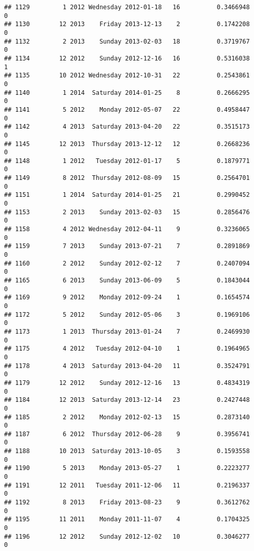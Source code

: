 \documentclass[
]{article}
\begin{document}
\begin{verbatim}
## 1129         1 2012 Wednesday 2012-01-18   16          0.3466948             0
## 1130        12 2013    Friday 2013-12-13    2          0.1742208             0
## 1132         2 2013    Sunday 2013-02-03   18          0.3719767             0
## 1134        12 2012    Sunday 2012-12-16   16          0.5316038             1
## 1135        10 2012 Wednesday 2012-10-31   22          0.2543861             0
## 1140         1 2014  Saturday 2014-01-25    8          0.2666295             0
## 1141         5 2012    Monday 2012-05-07   22          0.4958447             0
## 1142         4 2013  Saturday 2013-04-20   22          0.3515173             0
## 1145        12 2013  Thursday 2013-12-12   12          0.2668236             0
## 1148         1 2012   Tuesday 2012-01-17    5          0.1879771             0
## 1149         8 2012  Thursday 2012-08-09   15          0.2564701             0
## 1151         1 2014  Saturday 2014-01-25   21          0.2990452             0
## 1153         2 2013    Sunday 2013-02-03   15          0.2856476             0
## 1158         4 2012 Wednesday 2012-04-11    9          0.3236065             0
## 1159         7 2013    Sunday 2013-07-21    7          0.2891869             0
## 1160         2 2012    Sunday 2012-02-12    7          0.2407094             0
## 1165         6 2013    Sunday 2013-06-09    5          0.1843044             0
## 1169         9 2012    Monday 2012-09-24    1          0.1654574             0
## 1172         5 2012    Sunday 2012-05-06    3          0.1969106             0
## 1173         1 2013  Thursday 2013-01-24    7          0.2469930             0
## 1175         4 2012   Tuesday 2012-04-10    1          0.1964965             0
## 1178         4 2013  Saturday 2013-04-20   11          0.3524791             0
## 1179        12 2012    Sunday 2012-12-16   13          0.4834319             0
## 1184        12 2013  Saturday 2013-12-14   23          0.2427448             0
## 1185         2 2012    Monday 2012-02-13   15          0.2873140             0
## 1187         6 2012  Thursday 2012-06-28    9          0.3956741             0
## 1188        10 2013  Saturday 2013-10-05    3          0.1593558             0
## 1190         5 2013    Monday 2013-05-27    1          0.2223277             0
## 1191        12 2011   Tuesday 2011-12-06   11          0.2196337             0
## 1192         8 2013    Friday 2013-08-23    9          0.3612762             0
## 1195        11 2011    Monday 2011-11-07    4          0.1704325             0
## 1196        12 2012    Sunday 2012-12-02   10          0.3046277             0

\end{verbatim}
\end{document}
